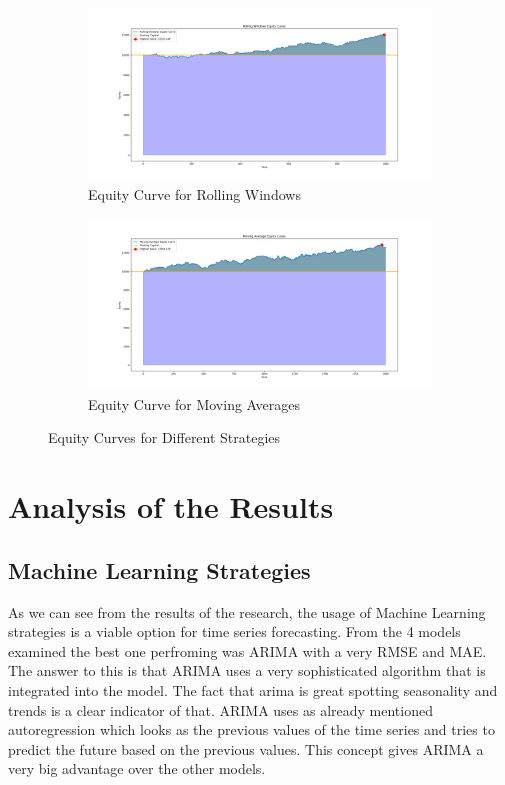 \documentclass{imc-inf}
\begin{document}
\begin{figure}[h!]
		\begin{subfigure}{0.45\textwidth}
			\centering
			\includegraphics[width=\textwidth]{equity_curve_rolling_windows.png}
			\caption{Equity Curve for Rolling Windows}
			\label{fig:equity_curve_rolling_windows}
		\end{subfigure}
		\hfill
		\begin{subfigure}{0.45\textwidth}
			\centering
			\includegraphics[width=\textwidth]{equity_curve_moving_averages.png}
			\caption{Equity Curve for Moving Averages}
			\label{fig:equity_curve_moving_averages}
		\end{subfigure}
		
		\caption{Equity Curves for Different Strategies}
		\label{fig:combined_equity_curves}
	\end{figure}
	
	\section{Analysis of the Results}
	\subsection{Machine Learning Strategies}
	As we can see from the results of the research, the usage of Machine Learning strategies is a viable option for time series forecasting. From the 4 models examined the best one perfroming was ARIMA with a very 
	RMSE and MAE. The answer to this is that ARIMA uses a very sophisticated algorithm that is integrated into the model. The fact that arima is great spotting seasonality and trends is a clear indicator of that.
	ARIMA uses as already mentioned autoregression which looks as the previous values of the time series and tries to predict the future based on the previous values. This concept gives ARIMA a very big advantage over the other models.
	
\end{document}
